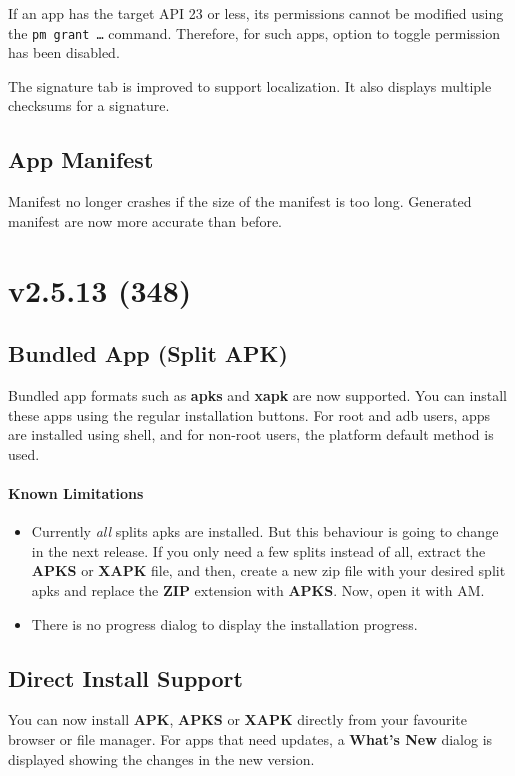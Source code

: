 If an app has the target API 23 or less, its permissions cannot be modified using the \texttt{pm grant \ldots} command.
Therefore, for such apps, option to toggle permission has been disabled.

The signature tab is improved to support localization. It also displays multiple checksums for a signature.

\subsection{App Manifest}
Manifest no longer crashes if the size of the manifest is too long. Generated manifest are now more accurate than before.


\section{v2.5.13 (348)}

\subsection{Bundled App (Split APK)}
Bundled app formats such as \textbf{apks} and \textbf{xapk} are now supported. You can install these apps using
the regular installation buttons. For root and adb users, apps are installed using shell, and for non-root users,
the platform default method is used.

\paragraph{Known Limitations}
\begin{itemize}
    \item Currently \textit{all} splits apks are installed. But this behaviour is going to change in the next release.
    If you only need a few splits instead of all, extract the \textbf{APKS} or \textbf{XAPK} file, and then, create a new zip
    file with your desired split apks and replace the \textbf{ZIP} extension with \textbf{APKS}. Now, open it with AM\@.
    \item There is no progress dialog to display the installation progress.
\end{itemize}

\subsection{Direct Install Support}
You can now install \textbf{APK}, \textbf{APKS} or \textbf{XAPK} directly from your favourite browser or file manager.
For apps that need updates, a \textbf{What's New} dialog is displayed showing the changes in the new version.


